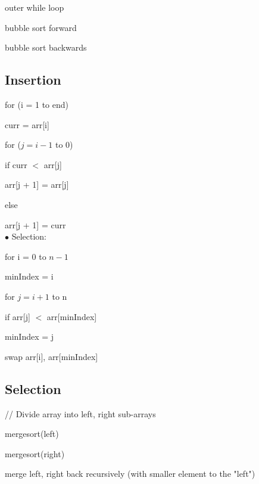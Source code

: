 \documentclass[english,openany]{book}
\begin{document}
    outer while loop

    \qquad bubble sort forward

    \qquad bubble sort backwards


    \subsection{Insertion}

    for (i = 1 to end)

    \qquad curr = arr[i]

    \qquad for ($j = i - 1$ to 0)

    \qquad \qquad if curr $<$ arr[j]

    \qquad \qquad \qquad arr[j + 1] = arr[j]

    \qquad \qquad else

    \qquad \qquad \qquad arr[j + 1] = curr\\

    $\bullet$ Selection:

    for i = 0 to $n - 1$

    \qquad minIndex = i

    \qquad for $j = i + 1$ to n

    \qquad \qquad if arr[j] $<$ arr[minIndex]

    \qquad \qquad \qquad minIndex = j

    \qquad \qquad swap arr[i], arr[minIndex]\\

    \subsection{Selection}

    // Divide array into left, right sub-arrays

    mergesort(left)

    mergesort(right)

    merge left, right back recursively (with smaller element to the "left")
\end{document}
